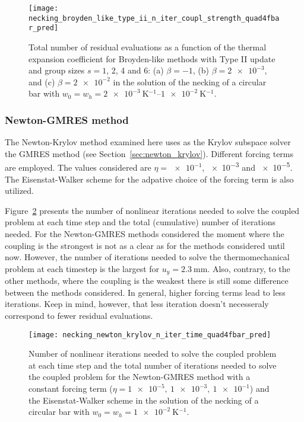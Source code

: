\begin{figure}[htbp]
  \centering
  \texttt{[image: necking\_broyden\_like\_type\_ii\_n\_iter\_coupl\_strength\_quad4fbar\_pred]}
  \caption{Total number of residual evaluations as a function of the thermal expansion coefficient for Broyden-like methods with Type II update and group sizes \(s=1\), 2, 4 and 6: (a) \(\beta=-1\), (b) \(\beta=\num{2e-3}\), and (c) \(\beta=\num{2e-2}\) in the solution of the necking of a circular bar with \(w_0=w_h=\SIrange{2e-3}{1e-2}{\kelvin^{-1}}\).}
\label{fig:necking_broyden_like_type_ii_n_iter_coupl_strength_quad4fbar_pred}
\end{figure}

\FloatBarrier

\subsubsection{Newton-GMRES method}

The Newton-Krylov method examined here uses as the Krylov subspace solver the GMRES method (see Section~\ref{sec:newton_krylov}).
Different forcing terms are employed.
The values considered are \(\eta=\num[print-unity-mantissa=false]{e-1}\), \num[print-unity-mantissa=false]{e-3} and \num[print-unity-mantissa=false]{e-5}.
The Eisenstat-Walker scheme for the adpative choice of the forcing term is also utilized.

Figure~\ref{fig:necking_newton_krylov_n_iter_time_quad4fbar_pred} presents the number of nonlinear iterations needed to solve the coupled problem at each time step and the total (cumulative) number of iterations needed.
For the Newton-GMRES methods considered the moment where the coupling is the strongest is not as a clear as for the methods considered until now.
However, the number of iterations needed to solve the thermomechanical problem at each timestep is the largest for \(u_y = \SI{2.3}{\milli\meter}\).
Also, contrary, to the other methods, where the coupling is the weakest there is still some difference between the methods considered.
In general, higher forcing terms lead to less iterations.
Keep in mind, however, that less iteration doesn't necesseraly correspond to fewer residual evaluations.

\begin{figure}
  \centering
  \texttt{[image: necking\_newton\_krylov\_n\_iter\_time\_quad4fbar\_pred]}
  \caption{Number of nonlinear iterations needed to solve the coupled problem at each time step and the total number of iterations needed to solve the coupled problem for the Newton-GMRES method with a constant forcing term (\(\eta=\num{1e-5},\ \num{1e-3},\ \num{1e-1}\)) and the Eisenstat-Walker scheme in the solution of the necking of a circular bar with \(w_0=w_h=\SI{1e-2}{\kelvin^{-1}}\).}
\label{fig:necking_newton_krylov_n_iter_time_quad4fbar_pred}
\end{figure}

